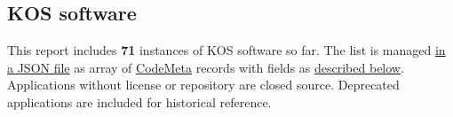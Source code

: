 \documentclass[
  DIV=10]{article}
\begin{document}
\subsection{KOS software}\label{kos-software}

This report includes \textbf{71} instances of KOS software so far. The
list is managed \href{kos-software.json}{in a JSON file} as array of
\href{https://codemeta.github.io/}{CodeMeta} records with fields as
\hyperref[metadata]{described below}. Applications without license or
repository are closed source. Deprecated applications are included for
historical reference.

\begin{longtable}[]{@{}lllllllll@{}}

\caption{\label{tbl-software}}

\tabularnewline


\end{longtable}
\end{document}
